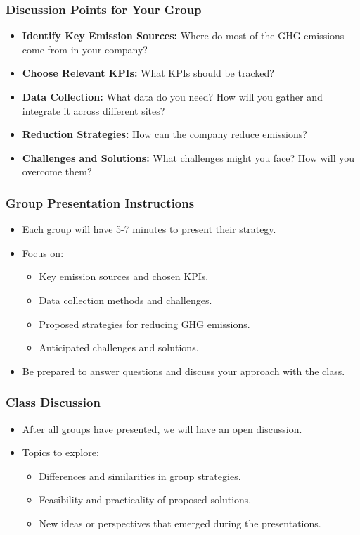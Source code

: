 \documentclass{beamer}
\begin{document}
\begin{frame}
\frametitle{Discussion Points for Your Group}
\begin{itemize}
    \item \textbf{Identify Key Emission Sources:} Where do most of the GHG emissions come from in your company?
    \item \textbf{Choose Relevant KPIs:} What KPIs should be tracked? 
    \item \textbf{Data Collection:} What data do you need? How will you gather and integrate it across different sites?
    \item \textbf{Reduction Strategies:} How can the company reduce emissions? 
    \item \textbf{Challenges and Solutions:} What challenges might you face? How will you overcome them?
\end{itemize}
\end{frame}

\begin{frame}
\frametitle{Group Presentation Instructions}
\begin{itemize}
    \item Each group will have 5-7 minutes to present their strategy.
    \item Focus on:
    \begin{itemize}
        \item Key emission sources and chosen KPIs.
        \item Data collection methods and challenges.
        \item Proposed strategies for reducing GHG emissions.
        \item Anticipated challenges and solutions.
    \end{itemize}
    \item Be prepared to answer questions and discuss your approach with the class.
\end{itemize}
\end{frame}

\begin{frame}
\frametitle{Class Discussion}
\begin{itemize}
    \item After all groups have presented, we will have an open discussion.
    \item Topics to explore:
    \begin{itemize}
        \item Differences and similarities in group strategies.
        \item Feasibility and practicality of proposed solutions.
        \item New ideas or perspectives that emerged during the presentations.
    \end{itemize}
\end{itemize}
\end{frame}
\end{document}
